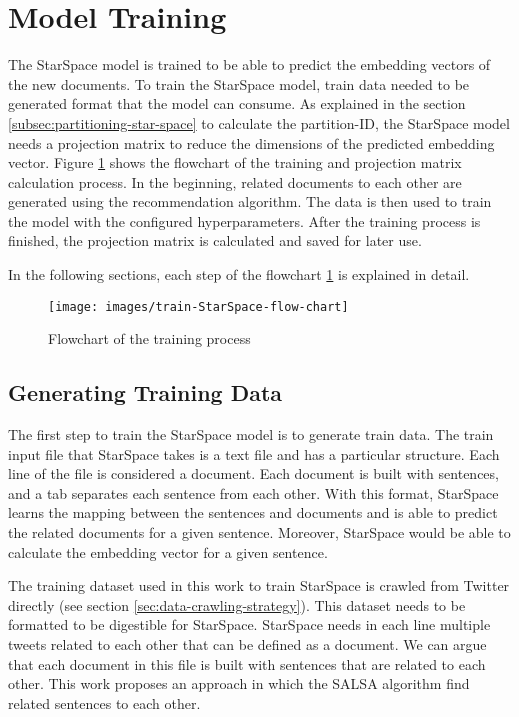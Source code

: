 \section{Model Training}
\label{sec:model-training}
The StarSpace model is trained to be able to predict the embedding vectors of the new documents. To train the StarSpace model, train data needed to be generated format that the model can consume. As explained in the section \ref{subsec:partitioning-star-space} to calculate the partition-ID, the StarSpace model needs a projection matrix to reduce the dimensions of the predicted embedding vector. Figure \ref{fig:star-space-training} shows the flowchart of the training and projection matrix calculation process. In the beginning, related documents to each other are generated using the recommendation algorithm. The data is then used to train the model with the configured hyperparameters. After the training process is finished, the projection matrix is calculated and saved for later use.

In the following sections, each step of the flowchart \ref{fig:star-space-training} is explained in detail.

\begin{figure}[!h]
    \centering
    \texttt{[image: images/train-StarSpace-flow-chart]}
    \caption{Flowchart of the training process}
    \label{fig:star-space-training}
\end{figure}

\subsection{Generating Training Data}
\label{subsec:generating-training-data}
The first step to train the StarSpace model is to generate train data. The train input file that StarSpace takes is a text file and has a particular structure. Each line of the file is considered a document. Each document is built with sentences, and a tab separates each sentence from each other. With this format, StarSpace learns the mapping between the sentences and documents and is able to predict the related documents for a given sentence. Moreover, StarSpace would be able to calculate the embedding vector for a given sentence.


The training dataset used in this work to train StarSpace is crawled from Twitter directly (see section \ref{sec:data-crawling-strategy}). This dataset needs to be formatted to be digestible for StarSpace. StarSpace needs in each line multiple tweets related to each other that can be defined as a document. We can argue that each document in this file is built with sentences that are related to each other. This work proposes an approach in which the SALSA algorithm find related sentences to each other.


